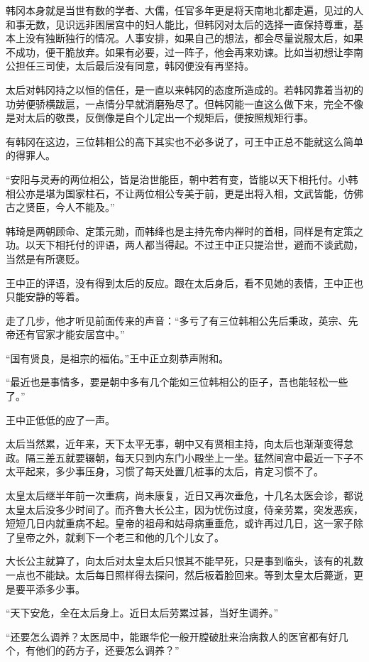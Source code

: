 韩冈本身就是当世有数的学者、大儒，任官多年更是将天南地北都走遍，见过的人和事无数，见识远非困居宫中的妇人能比，但韩冈对太后的选择一直保持尊重，基本上没有独断独行的情况。人事安排，如果自己的想法，都会尽量说服太后，如果不成功，便干脆放弃。如果有必要，过一阵子，他会再来劝谏。比如当初想让李南公担任三司使，太后最后没有同意，韩冈便没有再坚持。

太后对韩冈持之以恒的信任，是一直以来韩冈的态度所造成的。若韩冈靠着当初的功劳便骄横跋扈，一点情分早就消磨殆尽了。但韩冈能一直这么做下来，完全不像是对太后的敬畏，反倒像是自个儿定出一个规矩后，便按照规矩行事。

有韩冈在这边，三位韩相公的高下其实也不必多说了，可王中正总不能就这么简单的得罪人。

“安阳与灵寿的两位相公，皆是治世能臣，朝中若有变，皆能以天下相托付。小韩相公亦是堪为国家柱石，不让两位相公专美于前，更是出将入相，文武皆能，仿佛古之贤臣，今人不能及。”

韩琦是两朝顾命、定策元勋，而韩绛也是主持先帝内禅时的首相，同样是有定策之功。以天下相托付的评语，两人都当得起。不过王中正只提治世，避而不谈武勋，当然是有所褒贬。

王中正的评语，没有得到太后的反应。跟在太后身后，看不见她的表情，王中正也只能安静的等着。

走了几步，他才听见前面传来的声音：“多亏了有三位韩相公先后秉政，英宗、先帝还有官家才能安居宫中。”

“国有贤良，是祖宗的福佑。”王中正立刻恭声附和。

“最近也是事情多，要是朝中多有几个能如三位韩相公的臣子，吾也能轻松一些了。”

王中正低低的应了一声。

太后当然累，近年来，天下太平无事，朝中又有贤相主持，向太后也渐渐变得怠政。隔三差五就要辍朝，每天只到内东门小殿坐上一坐。猛然间宫中最近一下子不太平起来，多少事压身，习惯了每天处置几桩事的太后，肯定习惯不了。

太皇太后继半年前一次重病，尚未康复，近日又再次垂危，十几名太医会诊，都说太皇太后没多少时间了。而齐鲁大长公主，因为忧伤过度，侍亲劳累，突发恶疾，短短几日内就重病不起。皇帝的祖母和姑母病重垂危，或许再过几日，这一家子除了皇帝之外，就剩下一个老三和他的几个儿女了。

大长公主就算了，向太后对太皇太后只恨其不能早死，只是事到临头，该有的礼数一点也不能缺。太后每日照样得去探问，然后板着脸回来。等到太皇太后薨逝，更是要平添多少事。

“天下安危，全在太后身上。近日太后劳累过甚，当好生调养。”

“还要怎么调养？太医局中，能跟华佗一般开膛破肚来治病救人的医官都有好几个，有他们的药方子，还要怎么调养？”

